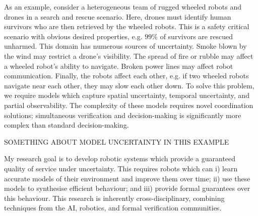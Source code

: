 \documentclass[11pt]{article}
\begin{document}
As an example, consider a heterogeneous team of rugged wheeled robots and drones in a search and rescue scenario.
%
Here, drones must identify human survivors who are then retrieved by the wheeled robots.
%
This is a safety critical scenario with obvious desired properties, e.g. $99\%$ of survivors are rescued unharmed.
%
This domain has numerous sources of uncertainty.
%
Smoke blown by the wind may restrict a drone's visibility.
%
The spread of fire or rubble may affect a wheeled robot's ability to navigate.
%
Broken power lines may affect robot communication.
%
Finally, the robots affect each other, e.g. if two wheeled robots navigate near each other, they may slow each other down.
%
To solve this problem, we require models which capture spatial uncertainty, temporal uncertainty, and partial observability.
%
The complexity of these models requires novel coordination solutions; simultaneous verification and decision-making is significantly more complex than standard decision-making.

SOMETHING ABOUT MODEL UNCERTAINTY IN THIS EXAMPLE


My research goal is to develop robotic systems which provide a guaranteed quality of service under uncertainty.
%
This requires robots which can i) learn accurate models of their environment and improve them over time; ii) use these models to synthesise efficient behaviour; and iii) provide formal guarantees over this behaviour.
%
This research is inherently cross-disciplinary, combining techniques from the AI, robotics, and formal verification communities.

\end{document}
